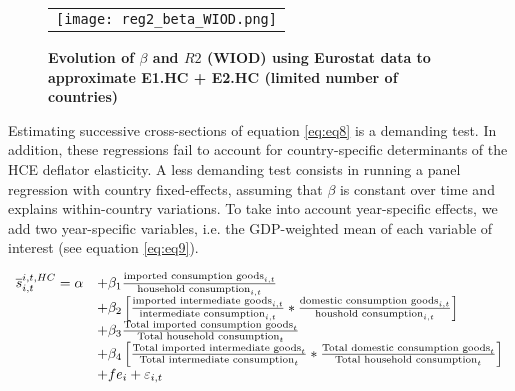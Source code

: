\documentclass[12pt,a4paper]{article}
\begin{document}
\begin{figure}[H]
	\centering
	\caption{\footnotesize{\textbf{Evolution of $\beta$ and $R2$ (WIOD) using Eurostat data to approximate E1.HC + E2.HC (limited number of countries)}}}
	\begin{tabular}{c}
		\texttt{[image: reg2\_beta\_WIOD.png]}\\
	\end{tabular}
	\label{fig:evolution_b_reg2}
\end{figure}

Estimating successive cross-sections of equation \ref{eq:eq8} is a demanding test. 
In addition, these regressions fail to account for country-specific determinants of the HCE deflator elasticity.
A less demanding test consists in running a panel regression with country fixed-effects, assuming that $\beta$ is constant over time and explains within-country variations. 
To take into account year-specific effects, we add two year-specific variables, i.e. the GDP-weighted mean of each variable of interest (see equation \ref{eq:eq9}). 


\begin{equation}
	\begin{array}{llll}
		\overline{s}_{i,t}^{i,t,HC}= \alpha &+  \beta_1  \frac{\textnormal{imported consumption goods}_{i,t}}{\textnormal{household consumption}_{i,t}} \\
		& + \beta_2 \left[ \frac{\textnormal{imported intermediate goods}_{i,t}}{\textnormal{intermediate consumption}_{i,t}}*\frac{\textnormal{domestic consumption goods}_{i,t}}{\textnormal{houshold consumption}_{i,t}}\right] \\ 
		&+  \beta_3 \frac{\textnormal{Total imported consumption goods}_t}{\textnormal{Total household consumption}_t} \\
		& + \beta_4  \left[ \frac{\textnormal{Total imported intermediate goods}_t}{\textnormal{Total intermediate consumption}_t}*\frac{\textnormal{Total domestic consumption goods}_t}{\textnormal{Total household consumption}_t} \right] \\ 
		& +fe_{i}+\varepsilon_{i,t}
	\end{array}
	\label{eq:eq9}
\end{equation}
\end{document}
